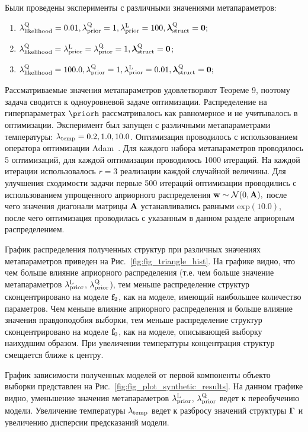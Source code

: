 Были проведены эксперименты с различными значениями метапараметров:
\begin{enumerate}
\item $\lambda_\text{likelihood}^\text{Q} = 0.01, \lambda_\text{prior}^\text{Q} = 1, \lambda_\text{prior}^\text{L} = 100, \boldsymbol{\lambda}_\text{struct}^\text{Q} = \mathbf{0};$
\item $\lambda_\text{likelihood}^\text{Q} = \lambda_\text{prior}^\text{L} = \lambda_\text{prior}^\text{Q} = 1, \boldsymbol{\lambda}_\text{struct}^\text{Q} = \mathbf{0}$;
\item $\lambda_\text{likelihood}^\text{Q} = 100.0, \lambda_\text{prior}^\text{Q} = 1, \lambda_\text{prior}^\text{L} = 0.01, \boldsymbol{\lambda}_\text{struct}^\text{Q} = \mathbf{0};$
\end{enumerate}
Рассматриваемые значения метапараметров удовлетворяют Теореме 9, поэтому задача сводится к одноуровневой задаче оптимизации.
Распределение на гиперпараметрах $\priorh$ рассматривалось как равномерное и не учитывалось в оптимизации. Эксперимент был запущен с различными метапараметрами температуры: $\lambda_{\text{temp}} = 0.2, 1.0, 10.0$. Оптимизация проводилось с использованием оператора оптимизации Adam~\cite{adam}. Для каждого набора метапараметров проводилось 5 оптимизаций, для каждой оптимизации проводилось 1000 итераций. На каждой итерации использовалось $r=3$ реализации каждой случайной величины.  Для улучшения сходимости задачи первые 500 итераций оптимизации проводились с использованием упрощенного априорного распределения $\mathbf{w} \sim \mathcal{N}(0, \mathbf{A}),$ после чего значения диагонали матрицы $\mathbf{A}$ устанавливались равными $\text{exp}(10.0)$, после чего оптимизация проводилась с указанным в данном разделе априорным распределением. 

График распределения полученных структур при различных значениях метапараметров приведен на Рис.~\ref{fig:fig_triangle_hist}. На графике видно, что чем больше влияние априорного распределения (т.е. чем больше значение метапараметров $\lambda_\text{prior}^\text{L}$, $\lambda_\text{prior}^\text{Q}$), тем меньше распределение структур сконцентрировано на моделе $\mathbf{f}_2$, как на моделе, имеющий наибольшее количество параметров. Чем меньше влияние априорного распределения и больше влияние значения правдоподобия выборки, тем меньше распределение структур сконцентрировано на моделе $\mathbf{f}_0$, как на моделе, описывающей выборку наихудшим образом. При увеличении температуры концентрация структур смещается ближе к центру.

График зависимости полученных моделей от первой компоненты объекто выборки представлен на Рис.~\ref{fig:fig_plot_synthetic_results}. На данном графике видно, уменьшение значения метапараметров $\lambda_\text{prior}^\text{L}$, $\lambda_\text{prior}^\text{Q}$ ведет к переобучению модели. Увеличение температуры $\lambda_{\text{temp}}$ ведет к разбросу значений структуры $\boldsymbol{\Gamma}$ и увеличению дисперсии предсказаний модели.

